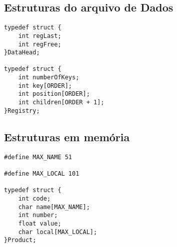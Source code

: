 \documentclass[12pt, a4paper]{article}
\begin{document}
\subsection{Estruturas do arquivo de Dados}\label{Estruturas do arquivo de Dados}
\begin{lstlisting}[title=Dados gravados no arquivo ``data.bin'']
typedef struct {
    int regLast;
    int regFree;
}DataHead;

typedef struct {
    int numberOfKeys;
	int key[ORDER];
	int position[ORDER];
	int children[ORDER + 1];
}Registry;
\end{lstlisting}

\subsection{Estruturas em memória}\label{Estruturas em memória}
\begin{lstlisting}
#define MAX_NAME 51

#define MAX_LOCAL 101

typedef struct {
    int code;
    char name[MAX_NAME];
    int number;
    float value;
    char local[MAX_LOCAL];
}Product;
\end{lstlisting}
\end{document}
